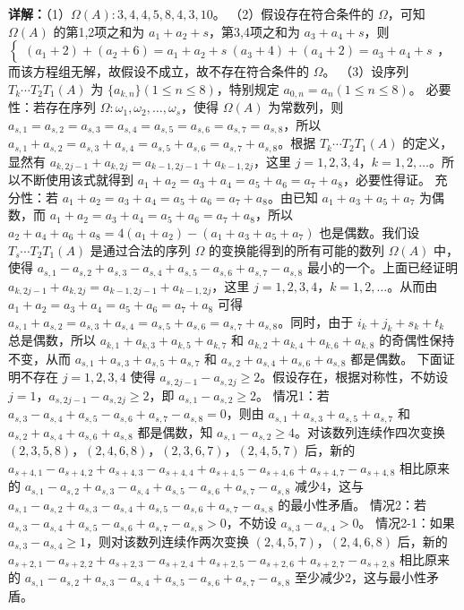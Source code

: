 \begin{question}[points=14]
\begin{solution}
\textbf{详解：}（1）$\Omega(A):3,4,4,5,8,4,3,10$。
（2）假设存在符合条件的 $\Omega$，可知 $\Omega(A)$ 的第1,2项之和为 $a_1+a_2+s$，第3,4项之和为 $a_3+a_4+s$，则 $\begin{cases} (a_1+2)+(a_2+6)=a_1+a_2+s \ (a_3+4)+(a_4+2)=a_3+a_4+s \end{cases}$，而该方程组无解，故假设不成立，故不存在符合条件的 $\Omega$。
（3）设序列 $T_k\cdots T_2T_1(A)$ 为 $\{a_{k,n}\}(1\leq n\leq 8)$，特别规定 $a_{0,n}=a_n(1\leq n\leq 8)$。
必要性：若存在序列 $\Omega:\omega_1,\omega_2,\dots,\omega_s$，使得 $\Omega(A)$ 为常数列，则 $a_{s,1}=a_{s,2}=a_{s,3}=a_{s,4}=a_{s,5}=a_{s,6}=a_{s,7}=a_{s,8}$，所以 $a_{s,1}+a_{s,2}=a_{s,3}+a_{s,4}=a_{s,5}+a_{s,6}=a_{s,7}+a_{s,8}$。根据 $T_k\cdots T_2T_1(A)$ 的定义，显然有 $a_{k,2j-1}+a_{k,2j}=a_{k-1,2j-1}+a_{k-1,2j}$，这里 $j=1,2,3,4$，$k=1,2,\dots$。所以不断使用该式就得到 $a_1+a_2=a_3+a_4=a_5+a_6=a_7+a_8$，必要性得证。
充分性：若 $a_1+a_2=a_3+a_4=a_5+a_6=a_7+a_8$。由已知 $a_1+a_3+a_5+a_7$ 为偶数，而 $a_1+a_2=a_3+a_4=a_5+a_6=a_7+a_8$，所以 $a_2+a_4+a_6+a_8=4(a_1+a_2)-(a_1+a_3+a_5+a_7)$ 也是偶数。我们设 $T_s\cdots T_2T_1(A)$ 是通过合法的序列 $\Omega$ 的变换能得到的所有可能的数列 $\Omega(A)$ 中，使得 $a_{s,1}-a_{s,2}+a_{s,3}-a_{s,4}+a_{s,5}-a_{s,6}+a_{s,7}-a_{s,8}$ 最小的一个。上面已经证明 $a_{k,2j-1}+a_{k,2j}=a_{k-1,2j-1}+a_{k-1,2j}$，这里 $j=1,2,3,4$，$k=1,2,\dots$。从而由 $a_1+a_2=a_3+a_4=a_5+a_6=a_7+a_8$ 可得 $a_{s,1}+a_{s,2}=a_{s,3}+a_{s,4}=a_{s,5}+a_{s,6}=a_{s,7}+a_{s,8}$。同时，由于 $i_k+j_k+s_k+t_k$ 总是偶数，所以 $a_{k,1}+a_{k,3}+a_{k,5}+a_{k,7}$ 和 $a_{k,2}+a_{k,4}+a_{k,6}+a_{k,8}$ 的奇偶性保持不变，从而 $a_{s,1}+a_{s,3}+a_{s,5}+a_{s,7}$ 和 $a_{s,2}+a_{s,4}+a_{s,6}+a_{s,8}$ 都是偶数。
下面证明不存在 $j=1,2,3,4$ 使得 $a_{s,2j-1}-a_{s,2j}\geq 2$。假设存在，根据对称性，不妨设 $j=1$，$a_{s,2j-1}-a_{s,2j}\geq 2$，即 $a_{s,1}-a_{s,2}\geq 2$。
情况1：若 $a_{s,3}-a_{s,4}+a_{s,5}-a_{s,6}+a_{s,7}-a_{s,8}=0$，则由 $a_{s,1}+a_{s,3}+a_{s,5}+a_{s,7}$ 和 $a_{s,2}+a_{s,4}+a_{s,6}+a_{s,8}$ 都是偶数，知 $a_{s,1}-a_{s,2}\geq 4$。对该数列连续作四次变换 $(2,3,5,8)$，$(2,4,6,8)$，$(2,3,6,7)$，$(2,4,5,7)$ 后，新的 $a_{s+4,1}-a_{s+4,2}+a_{s+4,3}-a_{s+4,4}+a_{s+4,5}-a_{s+4,6}+a_{s+4,7}-a_{s+4,8}$ 相比原来的 $a_{s,1}-a_{s,2}+a_{s,3}-a_{s,4}+a_{s,5}-a_{s,6}+a_{s,7}-a_{s,8}$ 减少4，这与 $a_{s,1}-a_{s,2}+a_{s,3}-a_{s,4}+a_{s,5}-a_{s,6}+a_{s,7}-a_{s,8}$ 的最小性矛盾。
情况2：若 $a_{s,3}-a_{s,4}+a_{s,5}-a_{s,6}+a_{s,7}-a_{s,8}>0$，不妨设 $a_{s,3}-a_{s,4}>0$。
情况2-1：如果 $a_{s,3}-a_{s,4}\geq 1$，则对该数列连续作两次变换 $(2,4,5,7)$，$(2,4,6,8)$ 后，新的 $a_{s+2,1}-a_{s+2,2}+a_{s+2,3}-a_{s+2,4}+a_{s+2,5}-a_{s+2,6}+a_{s+2,7}-a_{s+2,8}$ 相比原来的 $a_{s,1}-a_{s,2}+a_{s,3}-a_{s,4}+a_{s,5}-a_{s,6}+a_{s,7}-a_{s,8}$ 至少减少2，这与最小性矛盾。

\end{solution}
\end{question}
